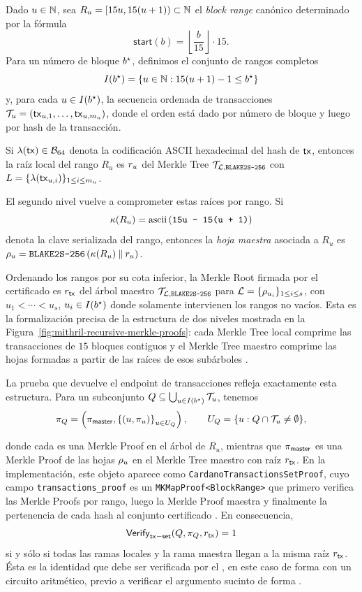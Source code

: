 Dado $u \in \mathbb{N}$, sea $R_u = [15u,15(u+1)) \subset \mathbb{N}$ el \textit{block range} canónico determinado por la fórmula
$$\mathsf{start}(b) = \left\lfloor \frac{b}{15} \right\rfloor \cdot 15.$$
Para un número de bloque $b^\star$, definimos el conjunto de rangos completos
$$I(b^\star) = \left\{u \in \mathbb{N} : 15(u + 1) - 1 \leq b^\star \right\}$$
y, para cada $u \in I(b^\star)$, la secuencia ordenada de transacciones $\mathcal{T}_{u} = (\mathsf{tx}_{u,1},\ldots,\mathsf{tx}_{u,m_u})$, donde el orden está dado por número de bloque y luego por hash de la transacción. 

Si $\lambda(\mathsf{tx}) \in \mathcal{B}_{64}$ denota la codificación ASCII hexadecimal del hash de $\mathsf{tx}$, entonces la raíz local del rango $R_u$ es $r_{u}$ del Merkle Tree $\mathcal{T}_{\mathcal{L}, \texttt{BLAKE2S-256}}$ con $L = \{\lambda(\mathsf{tx}_{u,i})\}_{1\leq i\leq m_u}$.

El segundo nivel vuelve a comprometer estas raíces por rango. Si
$$\kappa(R_u) = \mathrm{ascii} \left(\texttt{15u - 15(u + 1)}\right)$$
denota la clave serializada del rango, entonces la \textit{hoja maestra} asociada a $R_u$ es $\rho_{u} = \texttt{BLAKE2S-256} \left(\kappa(R_u)\mathbin{\|} r_{u} \right)$.

Ordenando los rangos por su cota inferior, la Merkle Root firmada por el certificado es $r_{\mathsf{tx}}$ del árbol maestro $\mathcal{T}_{\mathcal{L}, \texttt{BLAKE2S-256}}$ para $\mathcal{L} = \{\rho_{u_i}\}_{1\leq i \leq s}$, con $u_1 < \cdots < u_s$, $u_i \in I(b^\star)$ donde solamente intervienen los rangos no vacíos. Esta es la formalización precisa de la estructura de dos niveles mostrada en la Figura~\ref{fig:mithril-recursive-merkle-proofs}: cada Merkle Tree local comprime las transacciones de $15$ bloques contiguos y el Merkle Tree maestro comprime las hojas formadas a partir de las raíces de esos subárboles \cite{MithrilDocsTransactions,MithrilSTMRepo}.

La prueba que devuelve el endpoint de transacciones refleja exactamente esta estructura. Para un subconjunto $Q \subseteq \bigcup_{u \in I(b^\star)} \mathcal{T}_{u}$, tenemos
$$\pi_Q = \left(\pi_{\mathsf{master}}, \left\{(u, \pi_u)\right\}_{u \in U_Q} \right), \qquad U_Q = \{u: Q \cap \mathcal{T}_{u} \neq \emptyset\},$$

donde cada \RangeProof es una Merkle Proof en el árbol de $R_u$, mientras que $\pi_{\mathsf{master}}$ es una Merkle Proof de las hojas $\rho_{u}$ en el Merkle Tree maestro con raíz $r_{\mathsf{tx}}$. En la implementación, este objeto aparece como \texttt{CardanoTransactionsSetProof}, cuyo campo \texttt{transactions\_proof} es un \texttt{MKMapProof<BlockRange>} que primero verifica las Merkle Proofs por rango, luego la Merkle Proof maestra y finalmente la pertenencia de cada hash al conjunto certificado \cite{MithrilSTMRepo}. En consecuencia,
$$\mathsf{Verify}_{\mathsf{tx-set}}(Q, \pi_Q, r_{\mathsf{tx}}) = 1$$
si y sólo si todas las ramas locales y la rama maestra llegan a la misma raíz $r_{\mathsf{tx}}$. Ésta es la identidad que debe ser verificada por el \zkBridge, en este caso de forma \Offchain con un circuito aritmético, previo a verificar el argumento sucinto de forma \Onchain.

